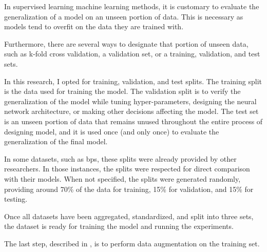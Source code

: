 
In supervised learning machine learning methods, it is
customary to evaluate the generalization of a model on an
unseen portion of data. This is necessary as models tend to
\gls{overfit} on the data they are trained with.

Furthermore, there are several ways to designate that
portion of unseen data, such as k-fold cross validation, a
validation set, or a training, validation, and test sets. 

In this research, I opted for training, validation, and test
splits. The training split is the data used for training the
model. The validation split is to verify the generalization
of the model while tuning hyper-parameters, designing the
neural network architecture, or making other decisions
affecting the model. The test set is an unseen portion of
data that remains unused throughout the entire process of
designing model, and it is used once (and only once) to
evaluate the generalization of the final model.

In some datasets, such as \gls{bps}, these splits were
already provided by other researchers. In those instances,
the splits were respected for direct comparison with their
models. When not specified, the splits were generated
randomly, providing around 70\% of the data for training,
15\% for validation, and 15\% for testing.

Once all datasets have been aggregated, standardized, and
split into three sets, the dataset is ready for training
the model and running the experiments.

The last step, described in , is
to perform data augmentation on the training set.
